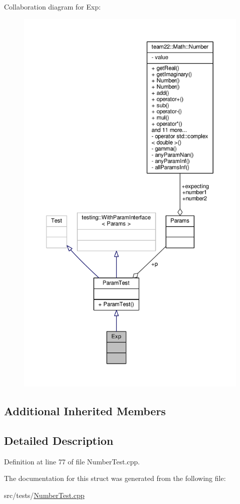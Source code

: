 Collaboration diagram for Exp\+:
\nopagebreak
\begin{figure}[H]
\begin{center}
\leavevmode
\includegraphics[height=550pt]{struct_exp__coll__graph}
\end{center}
\end{figure}
\subsection*{Additional Inherited Members}


\subsection{Detailed Description}


Definition at line 77 of file Number\+Test.\+cpp.



The documentation for this struct was generated from the following file\+:\begin{DoxyCompactItemize}
\item 
src/tests/\hyperlink{_number_test_8cpp}{Number\+Test.\+cpp}\end{DoxyCompactItemize}

